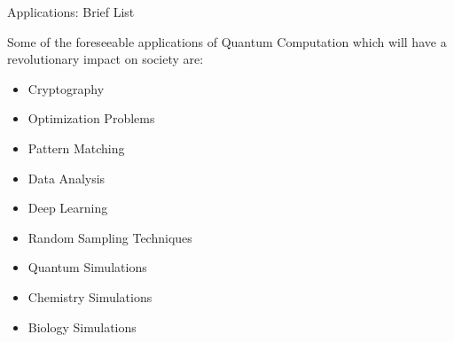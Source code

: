 \documentclass[9pt, handout, aspectratio=169]{beamer}		%
\begin{document}
	\begin{frame}{Applications: Brief List}

		Some of the foreseeable applications of Quantum Computation which will have a revolutionary impact on society are:

		\begin{multicols}{2}
			\begin{itemize}
				\item<2->{ Cryptography }
				\item<3->{ Optimization Problems }
				\item<4->{ Pattern Matching }
				\item<4->{ Data Analysis }
				\item<5->{ Deep Learning }
				\item<5->{ Random Sampling Techniques }
				\item<6->{ Quantum Simulations }
				\item<6->{ Chemistry Simulations }
				\item<6->{ Biology Simulations }
			\end{itemize}

			\columnbreak
		\end{multicols}

	\end{frame}
\end{document}
